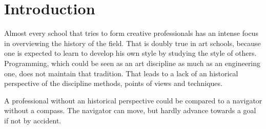 \section{Introduction}

Almost every school that tries to form creative professionals has an
intense focus in overviewing the history of the field. That is doubly
true in art schools, because one is expected to learn to develop his
own style by studying the style of others. Programming, which could be
seen as an art discipline as much as an engineering one, does not
maintain that tradition. That leads to a lack of an historical
perspective of the discipline methods, points of views and techniques.

A professional without an historical perspective could be compared to
a navigator without a compass. The navigator can move, but hardly
advance towards a goal if not by accident. 


